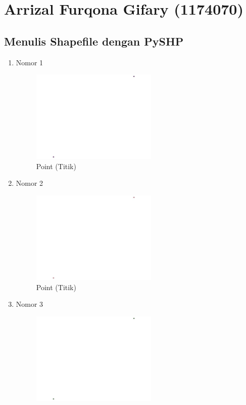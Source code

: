 \section{Arrizal Furqona Gifary (1174070)}
\subsection{Menulis Shapefile dengan PySHP}
\begin{enumerate}
	\item Nomor 1
	
	\begin{figure}[H]
		\includegraphics[width=6cm]{figures/Tugas2/1174070/No1.jpeg}
		\centering
		\caption{Point (Titik)}
	\end{figure}
	\item Nomor 2
	
	\begin{figure}[H]
		\includegraphics[width=6cm]{figures/Tugas2/1174070/No2.jpeg}
		\centering
		\caption{Point (Titik)}
	\end{figure}
	\item Nomor 3
	
	\begin{figure}[H]
		\includegraphics[width=6cm]{figures/Tugas2/1174070/No3.jpeg}

\end{figure}
\end{enumerate}
